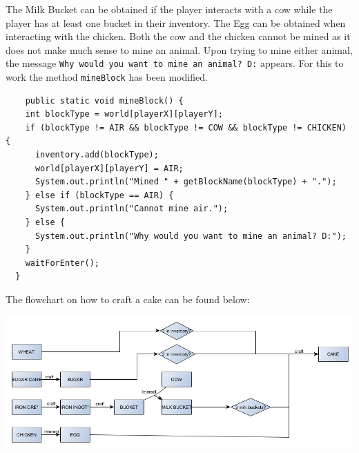 The Milk Bucket can be obtained if the player interacts with a cow while the player has at least one bucket in their inventory. The Egg can be obtained when interacting with the chicken. Both the cow and the chicken cannot be mined as it does not make much sense to mine an animal. Upon trying to mine either animal, the message \texttt{Why would you want to mine an animal? D:} appears. For this to work the method \texttt{mineBlock} has been modified.

\begin{lstlisting}
    public static void mineBlock() {
    int blockType = world[playerX][playerY];
    if (blockType != AIR && blockType != COW && blockType != CHICKEN) {
      inventory.add(blockType);
      world[playerX][playerY] = AIR;
      System.out.println("Mined " + getBlockName(blockType) + ".");
    } else if (blockType == AIR) {
      System.out.println("Cannot mine air.");
    } else {
      System.out.println("Why would you want to mine an animal? D:");
    }
    waitForEnter();
  }
\end{lstlisting}

The flowchart on how to craft a cake can be found below:

{\includegraphics[width=\textwidth]{../flowchart/cake.jpg}}
